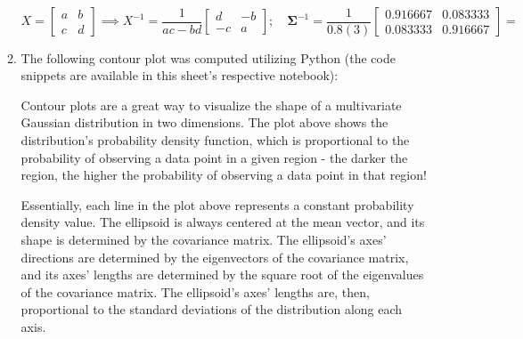 \documentclass[12pt]{article}
\begin{document}
\begin{enumerate}[leftmargin=\labelsep]
\begin{enumerate}
{                $$
                  X = \begin{bmatrix}
                    a & b \\
                    c & d
                  \end{bmatrix} \implies X^{-1} = \frac{1}{ac - bd} \begin{bmatrix}
                    d  & -b \\
                    -c & a
                  \end{bmatrix}; \quad
                  \boldsymbol{\Sigma}^{-1} = \frac{1}{0.8(3)} \begin{bmatrix}
                    0.916667 & 0.083333 \\
                    0.083333 & 0.916667
                  \end{bmatrix} = 
                $$
                }
          \item {
                The following contour plot was computed utilizing Python (the code snippets
                are available in this sheet's respective notebook):

                \begin{figure}[H]
                  \centering
                  
                \end{figure}

                Contour plots are a great way to visualize the shape of a multivariate Gaussian
                distribution in two dimensions. The plot above shows the distribution's
                probability density function, which is proportional to the probability
                of observing a data point in a given region - the darker the region, the
                higher the probability of observing a data point in that region!

                Essentially, each line in the plot above represents a constant probability
                density value. The ellipsoid is always centered at the mean vector,
                and its shape is determined by the covariance matrix.
                The ellipsoid's axes' directions are determined by the eigenvectors of the
                covariance matrix, and its axes' lengths are determined by the square root
                of the eigenvalues of the covariance matrix. The ellipsoid's axes' lengths
                are, then, proportional to the standard deviations of the distribution along each
                axis.
                }


\end{enumerate}
\end{enumerate}
\end{document}
